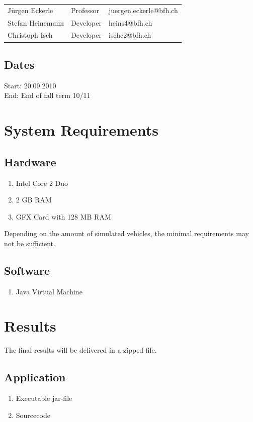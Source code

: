 \documentclass[a4paper,10pt,titlepage]{article}
\begin{document}
\begin{tabularx}{\textwidth}{XXX}
 Jürgen Eckerle & Professor & juergen.eckerle@bfh.ch \\
 Stefan Heinemann & Developer & heins4@bfh.ch \\
 Christoph Isch & Developer & ischc2@bfh.ch \\
\end{tabularx}

\subsection{Dates}

Start: 20.09.2010 \\
End: End of fall term 10/11

\section{System Requirements}

\subsection{Hardware}
\begin{enumerate}
 \item Intel Core 2 Duo
 \item 2 GB RAM
 \item GFX Card with 128 MB RAM
\end{enumerate}

Depending on the amount of simulated vehicles, the minimal requirements may not be sufficient.


\subsection{Software}
\begin{enumerate}
 \item Java Virtual Machine
\end{enumerate}


\section{Results}

The final results will be delivered in a zipped file.

\subsection{Application}
\begin{enumerate}
 \item Executable jar-file
 \item Sourcecode
\end{enumerate}
\end{document}
